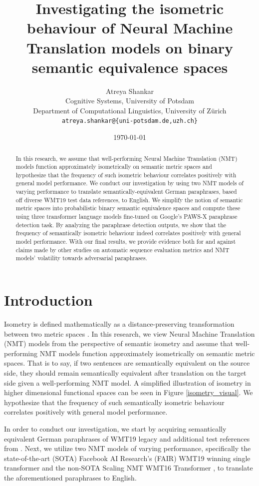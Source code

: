 \documentclass[11pt,a4paper]{article}
\title{Investigating the isometric behaviour of Neural Machine Translation models on binary semantic equivalence spaces}
\author{Atreya Shankar \\
  Cognitive Systems, University of Potsdam \\
  Department of Computational Linguistics, University of Zürich \\
  \texttt{atreya.shankar@\{uni-potsdam.de,uzh.ch\}}}
\date{\today}
\begin{document}
\maketitle

\begin{abstract}
In this research, we assume that well-performing Neural Machine Translation (NMT) models function approximately isometrically on semantic metric spaces and hypothesize that the frequency of such isometric behaviour correlates positively with general model performance. We conduct our investigation by using two NMT models of varying performance to translate semantically-equivalent German paraphrases, based off diverse WMT19 test data references, to English. We simplify the notion of semantic metric spaces into probabilistic binary semantic equivalence spaces and compute these using three transformer language models fine-tuned on Google's PAWS-X paraphrase detection task. By analyzing the paraphrase detection outputs, we show that the frequency of semantically isometric behaviour indeed correlates positively with general model performance. With our final results, we provide evidence both for and against claims made by other studies on automatic sequence evaluation metrics and NMT models' volatility towards adversarial paraphrases.
\end{abstract}

\section{Introduction}

Isometry is defined mathematically as a distance-preserving transformation between two metric spaces \cite{coxeter1961introduction}. In this research, we view Neural Machine Translation (NMT) models from the perspective of semantic isometry and assume that well-performing NMT models function approximately isometrically on semantic metric spaces. That is to say, if two sentences are semantically equivalent on the source side, they should remain semantically equivalent after translation on the target side given a well-performing NMT model. A simplified illustration of isometry in higher dimensional functional spaces can be seen in Figure \ref{isometry_visual}. We hypothesize that the frequency of such semantically isometric behaviour correlates positively with general model performance. 

In order to conduct our investigation, we start by acquiring semantically equivalent German paraphrases of WMT19 legacy and additional test references from \citet{freitag-bleu-paraphrase-references-2020}. Next, we utilize two NMT models of varying performance, specifically the state-of-the-art (SOTA) Facebook AI Research's (FAIR) WMT19 winning single transformer \cite{ng2019facebook} and the non-SOTA Scaling NMT WMT16 Transformer \cite{ott2018scaling}, to translate the aforementioned paraphrases to English.
\end{document}
